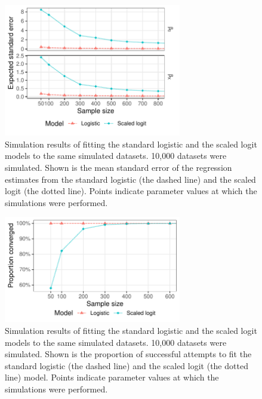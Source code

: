 \begin{figure}[htp]
	\centering
	\includegraphics[width=0.69\textwidth]{../logistic-plot/vary_nsam_se.pdf}
	\caption{
		Simulation results of fitting the standard logistic and the scaled logit models to the same simulated datasets. 10,000 datasets were simulated. Shown is the mean standard error of the regression estimates from the standard logistic (the dashed line) and the scaled logit (the dotted line). Points indicate parameter values at which the simulations were performed.
	}
	\label{SclrSE}
\end{figure}

\begin{figure}[htp]
	\centering
	\includegraphics[width=0.69\textwidth]{../logistic-plot/vary_nsam.pdf}
	\caption{
		Simulation results of fitting the standard logistic and the scaled logit models to the same simulated datasets. 10,000 datasets were simulated. Shown is the proportion of successful attempts to fit the standard logistic (the dashed line) and the scaled logit (the dotted line) model. Points indicate parameter values at which the simulations were performed.
	}
	\label{SclrConv}
\end{figure}

